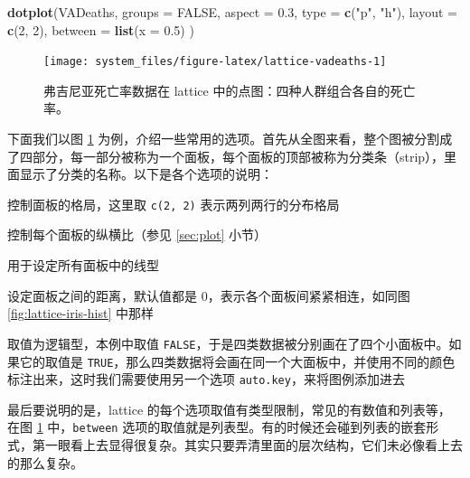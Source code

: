 \documentclass[
  b5paper,
  UTF8,twoside]{book}
\newenvironment{Shaded}{\begin{snugshade}}{\end{snugshade}}
\newcommand{\AttributeTok}[1]{\textcolor[rgb]{0.13,0.29,0.53}{#1}}
\newcommand{\ConstantTok}[1]{\textcolor[rgb]{0.56,0.35,0.01}{#1}}
\newcommand{\DecValTok}[1]{\textcolor[rgb]{0.00,0.00,0.81}{#1}}
\newcommand{\FloatTok}[1]{\textcolor[rgb]{0.00,0.00,0.81}{#1}}
\newcommand{\FunctionTok}[1]{\textcolor[rgb]{0.13,0.29,0.53}{\textbf{#1}}}
\newcommand{\NormalTok}[1]{#1}
\newcommand{\StringTok}[1]{\textcolor[rgb]{0.31,0.60,0.02}{#1}}
\providecommand{\tightlist}{%
  \setlength{\itemsep}{0pt}\setlength{\parskip}{0pt}}
\begin{document}
\begin{Shaded}
\begin{Highlighting}[]
\FunctionTok{dotplot}\NormalTok{(VADeaths,}
  \AttributeTok{groups =} \ConstantTok{FALSE}\NormalTok{, }\AttributeTok{aspect =} \FloatTok{0.3}\NormalTok{, }\AttributeTok{type =} \FunctionTok{c}\NormalTok{(}\StringTok{"p"}\NormalTok{, }\StringTok{"h"}\NormalTok{),}
  \AttributeTok{layout =} \FunctionTok{c}\NormalTok{(}\DecValTok{2}\NormalTok{, }\DecValTok{2}\NormalTok{), }\AttributeTok{between =} \FunctionTok{list}\NormalTok{(}\AttributeTok{x =} \FloatTok{0.5}\NormalTok{)}
\NormalTok{)}
\end{Highlighting}
\end{Shaded}

\begin{figure}

{\centering \texttt{[image: system\_files/figure-latex/lattice-vadeaths-1]} 

}

\caption[弗吉尼亚死亡率数据在 lattice 中的点图]{弗吉尼亚死亡率数据在 lattice 中的点图：四种人群组合各自的死亡率。}\label{fig:lattice-vadeaths}
\end{figure}



下面我们以图 \ref{fig:lattice-vadeaths} 为例，介绍一些常用的选项。首先从全图来看，整个图被分割成了四部分，每一部分被称为一个面板，每个面板的顶部被称为分类条（strip），里面显示了分类的名称。以下是各个选项的说明：

\begin{description}
\tightlist
\item[\texttt{layout}]
控制面板的格局，这里取 \texttt{c(2,\ 2)} 表示两列两行的分布格局
\item[\texttt{aspect}]
控制每个面板的纵横比（参见 \ref{sec:plot} 小节）
\item[\texttt{type}]
用于设定所有面板中的线型
\item[\texttt{between}]
设定面板之间的距离，默认值都是 0，表示各个面板间紧紧相连，如同图 \ref{fig:lattice-iris-hist} 中那样
\item[\texttt{groups}]
取值为逻辑型，本例中取值 \texttt{FALSE}，于是四类数据被分别画在了四个小面板中。如果它的取值是 \texttt{TRUE}，那么四类数据将会画在同一个大面板中，并使用不同的颜色标注出来，这时我们需要使用另一个选项 \texttt{auto.key}，来将图例添加进去
\end{description}

最后要说明的是，lattice 的每个选项取值有类型限制，常见的有数值和列表等，在图 \ref{fig:lattice-vadeaths} 中，\texttt{between} 选项的取值就是列表型。有的时候还会碰到列表的嵌套形式，第一眼看上去显得很复杂。其实只要弄清里面的层次结构，它们未必像看上去的那么复杂。
\end{document}
